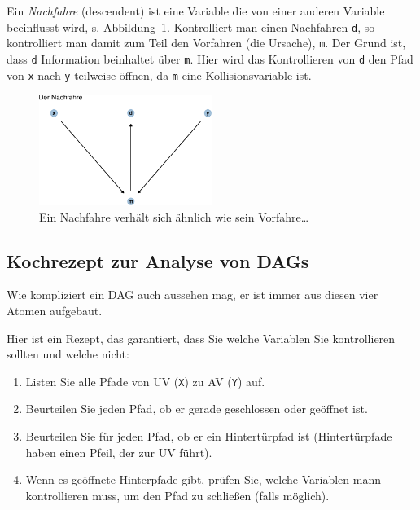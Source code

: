 \documentclass[
  a4paper,
  DIV=11]{scrreprt}
\providecommand{\tightlist}{%
  \setlength{\itemsep}{0pt}\setlength{\parskip}{0pt}}\usepackage{longtable,booktabs,array}
\theoremstyle{definition}
\theoremstyle{remark}
\begin{document}
Ein \emph{Nachfahre} (descendent) ist eine Variable die von einer
anderen Variable beeinflusst wird, s. Abbildung~\ref{fig-dag-nachfahre}.
Kontrolliert man einen Nachfahren \texttt{d}, so kontrolliert man damit
zum Teil den Vorfahren (die Ursache), \texttt{m}. Der Grund ist, dass
\texttt{d} Information beinhaltet über \texttt{m}. Hier wird das
Kontrollieren von \texttt{d} den Pfad von \texttt{x} nach \texttt{y}
teilweise öffnen, da \texttt{m} eine Kollisionsvariable ist.

\begin{figure}

{\centering \includegraphics[width=0.5\textwidth,height=\textheight]{./kausal_files/figure-pdf/fig-dag-nachfahre-1.pdf}

}

\caption{\label{fig-dag-nachfahre}Ein Nachfahre verhält sich ähnlich wie
sein Vorfahre\ldots{}}

\end{figure}

\hypertarget{kochrezept-zur-analyse-von-dags}{%
\subsection{Kochrezept zur Analyse von
DAGs}\label{kochrezept-zur-analyse-von-dags}}

Wie kompliziert ein DAG auch aussehen mag, er ist immer aus diesen vier
Atomen aufgebaut.

Hier ist ein Rezept, das garantiert, dass Sie welche Variablen Sie
kontrollieren sollten und welche nicht:

\begin{enumerate}
\def\labelenumi{\arabic{enumi}.}
\tightlist
\item
  Listen Sie alle Pfade von UV (\texttt{X}) zu AV (\texttt{Y}) auf.
\item
  Beurteilen Sie jeden Pfad, ob er gerade geschlossen oder geöffnet ist.
\item
  Beurteilen Sie für jeden Pfad, ob er ein Hintertürpfad ist
  (Hintertürpfade haben einen Pfeil, der zur UV führt).
\item
  Wenn es geöffnete Hinterpfade gibt, prüfen Sie, welche Variablen mann
  kontrollieren muss, um den Pfad zu schließen (falls möglich).
\end{enumerate}
\end{document}
